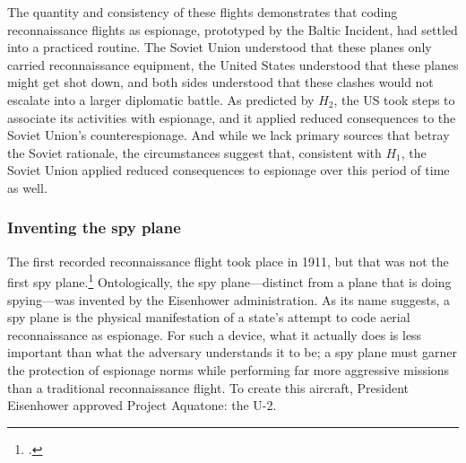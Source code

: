 \documentclass[12pt]{extarticle}
\begin{document}
The quantity and consistency of these flights demonstrates that coding reconnaissance flights as espionage, prototyped by the Baltic Incident, had settled into a practiced routine. The Soviet Union understood that these planes only carried reconnaissance equipment, the United States understood that these planes might get shot down, and both sides understood that these clashes would not escalate into a larger diplomatic battle. As predicted by $H_2$, the US took steps to associate its activities with espionage, and it applied reduced consequences to the Soviet Union's counterespionage. And while we lack primary sources that betray the Soviet rationale, the circumstances suggest that, consistent with $H_1$, the Soviet Union applied reduced consequences to espionage over this period of time as well.

\subsubsection{Inventing the spy plane}

The first recorded reconnaissance flight took place in 1911, but that was not the first spy plane.\footcite[Surveilling the Turkish infantry near Tripoli, \enquote{Lieut. Piazzi today, for the first time in the history of warfare, made from this place an aerial reconnaissance against a hostile power}]{special_cable_to_the_new_york_times_air_1911} Ontologically, the spy plane---distinct from a plane that is doing spying---was invented by the Eisenhower administration. As its name suggests, a spy plane is the physical manifestation of a state's attempt to code aerial reconnaissance as espionage. For such a device, what it actually does is less important than what the adversary understands it to be; a spy plane must garner the protection of espionage norms while performing far more aggressive missions than a traditional reconnaissance flight. To create this aircraft, President Eisenhower approved Project Aquatone: the U-2.
\end{document}
